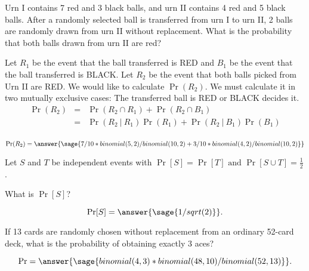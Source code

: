 \documentclass{ximera}
\begin{document}
\begin{problem}
Urn I contains 7 red and 3 black balls, and urn II contains 4 red and 5 black balls. After a randomly selected ball is transferred from urn I to urn II, 2 balls are randomly drawn from urn II without replacement. What is the probability that both balls drawn from urn II are red? 
\begin{hint}
Let $R_1$ be the event that the ball transferred is RED and $B_1$ be the event that the ball transferred is BLACK. Let $R_2$ be the event that both balls picked from Urn II are RED. We would like to calculate $\Pr(R_2)$. We must calculate it in two mutually exclusive cases: The transferred ball is RED or BLACK decides it. 
\begin{eqnarray*} 
\Pr(R_2)
&=&\Pr(R_2\cap R_1)+\Pr(R_2\cap B_1) \\
&=&\Pr(R_2 ~|~ R_1)\Pr(R_1)+\Pr(R_2~|~ B_1)\Pr(B_1) \\
\end{eqnarray*} 
\end{hint}

\begin{prompt}
$$\Pr(R_2)=\answer{\sage{7/10*binomial(5,2)/binomial(10,2)+3/10*binomial(4,2)/binomial(10,2)}}
$$
\end{prompt}

\end{problem}

\begin{problem}
 Let $S$ and $T$ be independent events with $\Pr[S] = \Pr[T] \text{ and }\Pr[S \cup T] = \frac{1}{2}$.

What is $\Pr[S]$? 

\begin{prompt}
$$\Pr[S]=\answer{\sage{1/sqrt(2)}}.$$
\end{prompt}

\end{problem}

\begin{problem}
If 13 cards are randomly chosen without replacement from an ordinary 52-card deck, what is the probability of obtaining exactly 3 aces? 

\begin{prompt}
$$\Pr=\answer{\sage{binomial(4,3)*binomial(48,10)/binomial(52,13)}}.$$
\end{prompt}

\end{problem}
\end{document}
